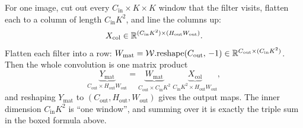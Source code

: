 \begin{idea}
For one image, cut out every $C_\text{in}\times K\times K$ window that the filter visits, flatten each to a column of length $C_\text{in}K^2$, and line the columns up:
\[
  X_\text{col} \in \mathbb{R}^{(C_\text{in}K^2)\times(H_\text{out}W_\text{out})}.
\]
Flatten each filter into a row: $W_\text{mat} = \mathcal W.\text{reshape}(C_\text{out},\,-1) \in \mathbb{R}^{C_\text{out}\times(C_\text{in}K^2)}$. Then the whole convolution is one matrix product
\[
  \underbrace{Y_\text{mat}}_{C_\text{out}\times H_\text{out}W_\text{out}} = \underbrace{W_\text{mat}}_{C_\text{out}\times C_\text{in}K^2}\;\underbrace{X_\text{col}}_{C_\text{in}K^2\times H_\text{out}W_\text{out}},
\]
and reshaping $Y_\text{mat}$ to $(C_\text{out},H_\text{out},W_\text{out})$ gives the output maps. The inner dimension $C_\text{in}K^2$ is ``one window'', and summing over it is exactly the triple sum in the boxed formula above.
\end{idea}

\begin{center}
\end{center}

